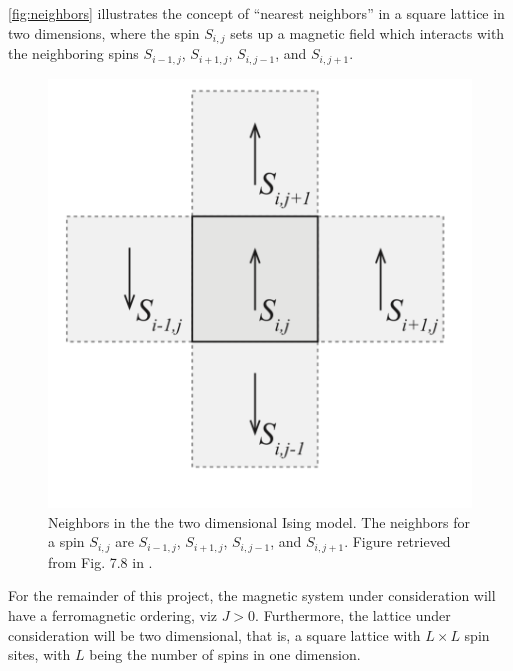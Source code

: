 \autoref{fig:neighbors} illustrates the concept of “nearest neighbors” in a square lattice in two dimensions, where the spin $S_{i,j}$ sets up a magnetic field which interacts with the neighboring spins $S_{i-1,j}$, $S_{i+1,j}$, $S_{i,j-1}$, and $S_{i,j+1}$.
\begin{figure}[H]
    \begin{minipage}[c]{0.4\textwidth}
    \caption{Neighbors in the the two dimensional Ising model. The neighbors for a spin $S_{i,j}$ are $S_{i-1,j}$, $S_{i+1,j}$, $S_{i,j-1}$, and $S_{i,j+1}$. Figure retrieved from Fig. 7.8 in \cite{Malthe}.} 
    \label{fig:neighbors}
    \end{minipage}\hfill
  \begin{minipage}[c]{0.4\textwidth}
    \includegraphics[scale=0.35]{./Images/lattice}
  \end{minipage}
\end{figure}

For the remainder of this project, the magnetic system under consideration will have a ferromagnetic ordering, viz $J>0$. Furthermore, the lattice under consideration will be two dimensional, that is, a square lattice with $L \times L$ spin sites, with $L$ being the number of spins in one dimension.

